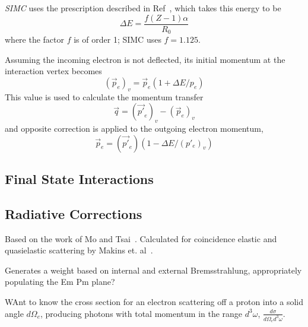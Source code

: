 \textit{SIMC} uses the prescription described in Ref~\cite{Aste_2005}, which
takes this energy to be
\begin{equation}
    \Delta E = \frac{f(Z-1)\alpha}{R_0}
\end{equation}
where the factor $f$ is of order 1; SIMC uses $f=1.125$.


Assuming the incoming electron is not deflected, its initial momentum at the
interaction vertex becomes
\begin{equation}
    (\vec{p}_e)_v = \vec{p}_e(1 + \Delta E / p_e)
\end{equation}
This value is used to calculate the momentum transfer
\begin{equation}
    \vec{q} = (\vec{p'}_e)_v - (\vec{p}_e)_v
\end{equation}
and opposite correction is applied to the outgoing electron momentum,
\begin{equation}
    \vec{p}_e = (\vec{p'}_e)(1 - \Delta E / (p'_e)_v)
\end{equation}

\subsection{Final State Interactions}



\subsection{Radiative Corrections}
Based on the work of Mo and Tsai~\cite{Mo_1969}.
Calculated for coincidence elastic and quasielastic scattering by Makins et.
al~\cite{Ent_2001, Makins_1994}.

Generates a weight based on internal and external Bremsstrahlung, appropriately
populating the Em Pm plane?

WAnt to know the cross section for an electron scattering off a proton into a
solid angle $d\Omega_e$, producing photons with total momentum in the range
$d^3\omega$, $\frac{d\sigma}{d\Omega_e d^3\omega}$.


